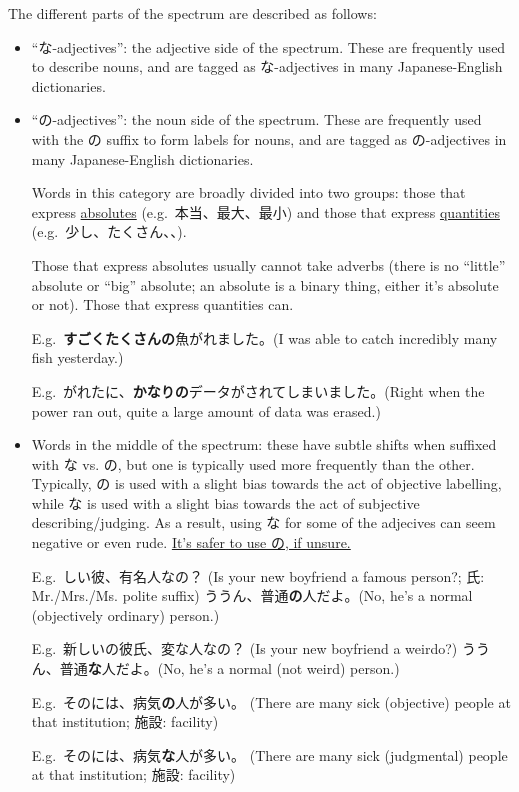 \documentclass[../nihongo-gakushuu-kyouzai.tex]{subfiles}
\begin{document}
The different parts of the spectrum are described as follows:
\begin{itemize}
    \item ``な-adjectives'': the adjective side of the spectrum. These are frequently used to describe nouns, and are tagged as な-adjectives in many Japanese-English dictionaries.
    \item ``の-adjectives'': the noun side of the spectrum. These are frequently used with the の suffix to form labels for nouns, and are tagged as の-adjectives in many Japanese-English dictionaries.

    Words in this category are broadly divided into two groups: those that express \ul{absolutes} (e.g.\ 本当、最大、最小) and those that express \ul{quantities} (e.g.\ 少し、たくさん、、).

    Those that express absolutes usually cannot take adverbs (there is no ``little'' absolute or ``big'' absolute; an absolute is a binary thing, either it's absolute or not). Those that express quantities can.

    E.g.\ \textbf{すごくたくさんの}魚がれました。(I was able to catch incredibly many fish yesterday.)

    E.g.\ がれたに、\textbf{かなりの}データがされてしまいました。(Right when the power ran out, quite a large amount of data was erased.)
    \item Words in the middle of the spectrum: these have subtle shifts when suffixed with な vs. の, but one is typically used more frequently than the other. Typically, の is used with a slight bias towards the act of objective labelling, while な is used with a slight bias towards the act of subjective describing/judging. As a result, using な for some of the adjecives can seem negative or even rude. \ul{It's safer to use の, if unsure.}

    E.g.\ しい彼、有名人なの？ (Is your new boyfriend a famous person?; 氏: Mr./Mrs./Ms. polite suffix) ううん、普通\textbf{の}人だよ。(No, he's a normal (objectively ordinary) person.)

    E.g.\ 新しいの彼氏、変な人なの？ (Is your new boyfriend a weirdo?) ううん、普通\textbf{な}人だよ。(No, he's a normal (not weird) person.)

    E.g.\ そのには、病気\textbf{の}人が多い。 (There are many sick (objective) people at that institution; 施設: facility)

    E.g.\ そのには、病気\textbf{な}人が多い。 (There are many sick (judgmental) people at that institution; 施設: facility)
\end{itemize}
\end{document}
